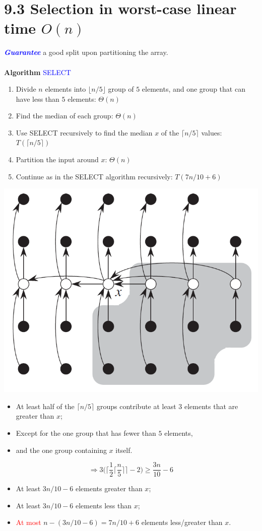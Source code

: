 \documentclass[a4paper]{article}
\begin{document}
\section*{9.3 Selection in worst-case linear time $O(n)$}
\textcolor{blue}{\textit{\textbf{Guarantee}}} a good split upon partitioning the array.\\
\\
\textbf{Algorithm} \textcolor{blue}{SELECT}
\begin{enumerate}
    \item Divide $n$ elements into $\lfloor n/5 \rfloor$ group of $5$ elements, and one group that can have less than $5$ elements: $\Theta(n)$
    \item Find the median of each group: $\Theta(n)$
    \item Use SELECT recursively to find the median $x$ of the $\lceil n/5 \rceil$ values: $T(\lceil n/5 \rceil)$
    \item Partition the input around $x$: $\Theta(n)$
    \item Continue as in the SELECT algorithm recursively: $T(7n/10+6)$
\end{enumerate}
\includegraphics[scale=0.5]{"algorithm SELECT"}
\begin{itemize}
    \item At least half of the $\lceil n/5\rceil$ groups contribute at least $3$ elements that are greater than $x$;
    \item Except for the one group that has fewer than $5$ elements,
    \item and the one group containing $x$ itself.
\end{itemize}
\begin{equation*}
    \Rightarrow 3\Bigg(\bigg\lceil\frac{1}{2}\Big\lceil\frac{n}{5}\Big\rceil\bigg\rceil-2\Bigg)\geq \frac{3n}{10}-6
\end{equation*}
\begin{itemize}
    \item At least $3n/10-6$ elements greater than $x$;
    \item At least $3n/10-6$ elements less than $x$;
    \item \textcolor{red}{At most} $n-(3n/10-6)=7n/10+6$ elements less/greater than $x$.
\end{itemize}
\end{document}
